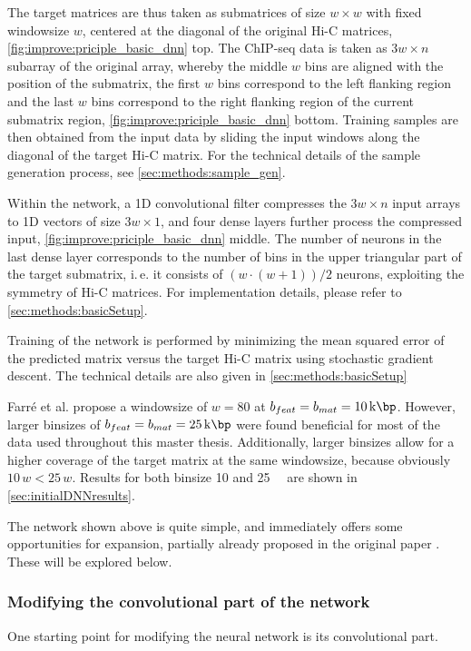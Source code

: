 The target matrices are thus taken as submatrices of size $w \times w$ 
with fixed windowsize $w$, centered at the diagonal of the 
original Hi-C matrices, \cref{fig:improve:priciple_basic_dnn} top.
The ChIP-seq data is taken as $3w \times n$ subarray of the original array,
whereby the middle $w$ bins are aligned with the position of the submatrix,
the first $w$ bins correspond to the left flanking region and the last $w$ bins correspond to 
the right flanking region of the current submatrix region, \cref{fig:improve:priciple_basic_dnn} bottom. 
Training samples are then obtained from the input data by sliding 
the input windows along the diagonal of the target Hi-C matrix. 
For the technical details of the sample generation process, see \cref{sec:methods:sample_gen}.

Within the network, a 1D convolutional filter compresses the $3w \times n$ input arrays to 1D vectors
of size $3w \times 1$, and four dense layers further process the compressed input, \cref{fig:improve:priciple_basic_dnn} middle.
The number of neurons in the last dense layer corresponds to the number of bins
in the upper triangular part of the target submatrix, i.\,e. it consists of $(w \cdot (w+1))/2$ neurons,
exploiting the symmetry of Hi-C matrices. 
For implementation details, please refer to \cref{sec:methods:basicSetup}.

Training of the network is performed by minimizing the mean squared error of the predicted matrix
versus the target Hi-C matrix using stochastic gradient descent.
The technical details are also given in \cref{sec:methods:basicSetup}

Farr\'e et al. propose a windowsize of $w=80$ at $b_{feat} = b_{mat} = \SI{10}{\kilo\bp}$.
However, larger binsizes of $b_{feat} = b_{mat} = \SI{25}{\kilo\bp}$ were found beneficial for 
most of the data used throughout this master thesis.
Additionally, larger binsizes allow for a higher coverage of the target matrix at the same windowsize,
because obviously $10\, w < 25\, w$.
Results for both binsize 10 and \SI{25}{\kilo\bp} are shown in \cref{sec:initialDNNresults}.

The network shown above is quite simple, and immediately offers some opportunities
for expansion, partially already proposed in the original paper \cite{Farre2018a}.
These will be explored below.

\subsubsection{Modifying the convolutional part of the network}
One starting point for modifying the neural network is its convolutional part.

